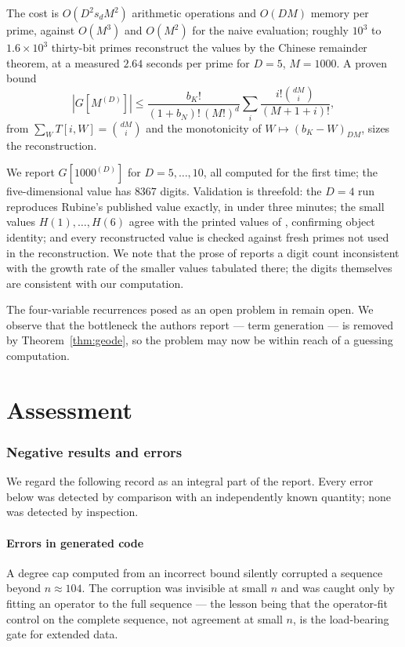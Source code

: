 \documentclass[11pt]{article}
\theoremstyle{definition}
\newcommand{\ff}[2]{(#1)_{#2}}
\begin{document}
The cost is $O(D^{2}s_dM^{2})$ arithmetic operations and $O(DM)$ memory per
prime, against $O(M^{3})$ and $O(M^{2})$ for the naive evaluation; roughly
$10^{3}$ to $1.6\times10^{3}$ thirty-bit primes reconstruct the values by the
Chinese remainder theorem, at a measured $2.64$ seconds per prime for $D=5$,
$M=1000$. A proven bound
\[
  |G[M^{(D)}]|\le\frac{b_K!}{(1+b_N)!\,(M!)^{d}}
   \sum_i\frac{i!\binom{dM}{i}}{(M{+}1{+}i)!},
\]
from $\sum_WT[i,W]=\binom{dM}{i}$ and the monotonicity of
$W\mapsto\ff{b_K-W}{DM}$, sizes the reconstruction.

We report $G[1000^{(D)}]$ for $D=5,\dots,10$, all computed for the first time;
the five-dimensional value has $8367$ digits. Validation is threefold: the
$D=4$ run reproduces Rubine's published value exactly, in under three minutes;
the small values $H(1),\dots,H(6)$ agree with the printed values of
\cite{AKZ}, confirming object identity; and every reconstructed value is
checked against fresh primes not used in the reconstruction. We note that the
prose of \cite{Rubine} reports a digit count inconsistent with the growth rate
of the smaller values tabulated there; the digits themselves are consistent
with our computation.

The four-variable recurrences posed as an open problem in \cite{AKZ} remain
open. We observe that the bottleneck the authors report --- term generation ---
is removed by Theorem~\ref{thm:geode}, so the problem may now be within reach
of a guessing computation.

\part{Assessment}

\section{Negative results and errors}\label{sec:negative}

We regard the following record as an integral part of the report. Every error
below was detected by comparison with an independently known quantity; none was
detected by inspection.

\subsection{Errors in generated code}

A degree cap computed from an incorrect bound silently corrupted a sequence
beyond $n\approx104$. The corruption was invisible at small $n$ and was caught
only by fitting an operator to the full sequence --- the lesson being that the
operator-fit control on the complete sequence, not agreement at small $n$, is
the load-bearing gate for extended data.
\end{document}
